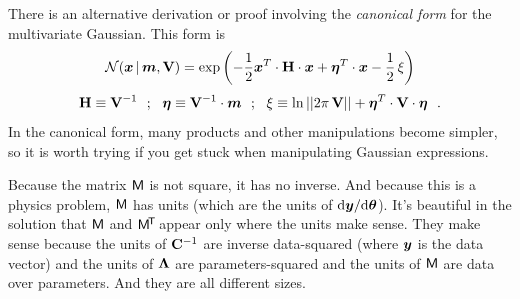 There is an alternative derivation or proof involving the
\textsl{canonical form} for the multivariate Gaussian. This form is
\begin{equation}
\mathcal{N}\!\,(\boldsymbol{x}\,|\,\boldsymbol{m},\mathbf{V}) = \exp\left(-\frac{1}{2}\boldsymbol{x}^T \cdot\mathbf{H} \cdot \boldsymbol{x} + \boldsymbol{\eta}^T \cdot \boldsymbol{x} - \frac{1}{2}\,\xi\right)
\end{equation}
\begin{equation}
\mathbf{H}\equiv\mathbf{V}^{-1} ~~;~~
\boldsymbol{\eta}\equiv\mathbf{V}^{-1}\cdot\boldsymbol{m} ~~;~~
\xi\equiv\ln||2\pi\,\mathbf{V}||+\boldsymbol{\eta}^T\cdot\mathbf{V}\cdot\boldsymbol{\eta} ~~.
\end{equation}
In the canonical form, many products and other manipulations become
simpler, so it is worth trying if you get stuck when manipulating Gaussian expressions.

Because the matrix $\mathsf{M}$ is not square, it has no inverse. And because this
is a physics problem, $\mathsf{M}$ has units (which are the units of
$\mathrm{d}\boldsymbol{y}/\mathrm{d}\boldsymbol{\theta}$).
It's beautiful in the solution that $\mathsf{M}$ and $\mathsf{M}^{\!\mathsf{T}\!}$ appear only where the
units make sense.
They make sense because the units of $\mathbf{C}^{-1}$ are inverse data-squared (where $\boldsymbol{y}$
is the data vector) and the units of $\mathbf{\Lambda}$ are parameters-squared and the units
of $\mathsf{M}$ are data over parameters.
And they are all different sizes.

